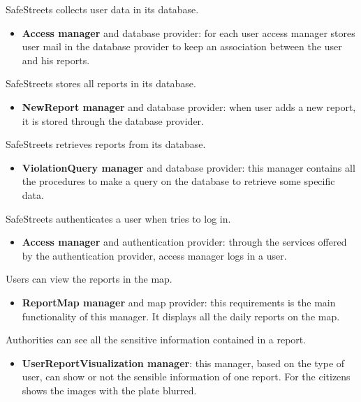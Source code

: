 \documentclass[../RASD.tex]{subfiles}
\begin{document}
\begin{enumerate}
         SafeStreets collects user data in its database.
        \begin{itemize}
            \item \textbf{Access manager} and database provider: for each user access manager stores user mail in the database provider
            to keep an association between the user and his reports.
        \end{itemize}

         SafeStreets stores all reports in its database.
        \begin{itemize}
            \item \textbf{NewReport manager} and database provider: when user adds a new report, it is stored through the database provider.
        \end{itemize}

         SafeStreets retrieves reports from its database.
        \begin{itemize}
            \item \textbf{ViolationQuery manager} and database provider: this manager contains all the procedures to make a query on the database
            to retrieve some specific data.
        \end{itemize}

         SafeStreets authenticates a user when tries to log in.
        \begin{itemize}
            \item \textbf{Access manager} and authentication provider: through the services offered by the authentication provider, access manager logs in a user.
        \end{itemize}

         Users can view the reports in the map.
        \begin{itemize}
            \item \textbf{ReportMap manager} and map provider: this requirements is the main functionality of this manager.
            It displays all the daily reports on the map.
        \end{itemize}


         Authorities can see all the sensitive information contained in a report.
        \begin{itemize}
            \item \textbf{UserReportVisualization manager}: this manager, based on the type of user, can show or not the sensible information of one report.
            For the citizens shows the images with the plate blurred.
        \end{itemize}


\end{enumerate}
\end{document}
